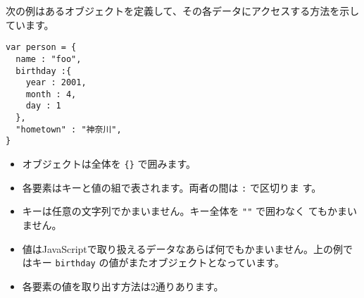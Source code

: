 次の例はあるオブジェクトを定義して、その各データにアクセスする方法を示し
ています。
\begin{Verbatim}
var person = {
  name : "foo",
  birthday :{
    year : 2001,
    month : 4,
    day : 1
  },
  "hometown" : "神奈川",
}
\end{Verbatim}
\begin{itemize}
 \item オブジェクトは全体を \verb+{}+ で囲みます。
 \item 各要素はキーと値の組で表されます。両者の間は \verb+:+ で区切りま
			 す。
 \item キーは任意の文字列でかまいません。キー全体を \verb+""+ で囲わなく
			 てもかまいません。
 \item 値はJavaScriptで取り扱えるデータなあらば何でもかまいません。上の例ではキー
       \verb+birthday+ の値がまたオブジェクトとなっています。
 \item 各要素の値を取り出す方法は2通りあります。


\end{itemize}
